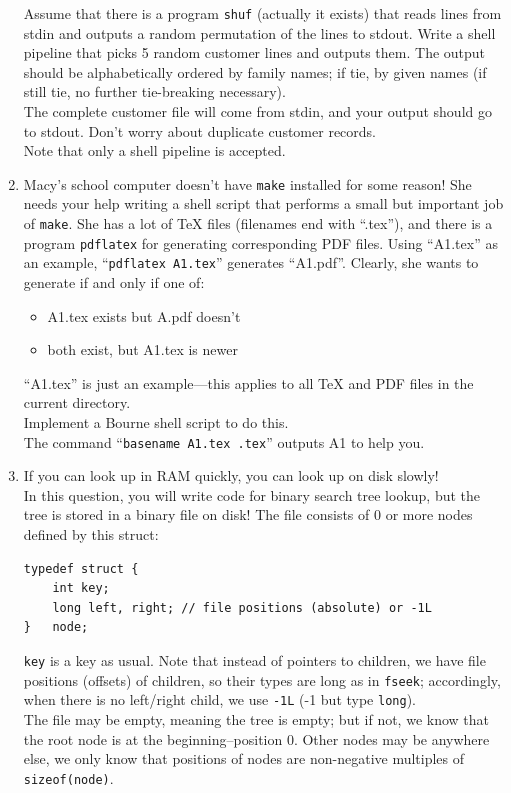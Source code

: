 \documentclass[11pt]{article}
\begin{document}
\begin{enumerate}
		Assume that there is a program \Verb|shuf| (actually it exists) that reads lines from stdin and outputs a random permutation of the lines to stdout. Write a shell pipeline that picks 5 random customer lines and outputs them. The output should be alphabetically ordered by family names; if tie, by given names (if still tie, no further tie-breaking necessary).\\

		The complete customer file will come from stdin, and your output should go to stdout. Don’t worry about duplicate customer records.\\

		Note that only a shell pipeline is accepted.
			

	\item Macy’s school computer doesn’t have \Verb|make| installed for some reason! She needs your help writing a shell script that performs a small but important job of \Verb|make|. She has a lot of TeX files (filenames end with “.tex”), and there is a program \Verb|pdflatex| for generating corresponding PDF files. Using “A1.tex” as an example, “\Verb|pdflatex A1.tex|” generates “A1.pdf”. Clearly, she wants to generate if and only if one of:
		\begin{itemize}
			\item A1.tex exists but A.pdf doesn't
			\item both exist, but A1.tex is newer
		\end{itemize}
		“A1.tex” is just an example—this applies to all TeX and PDF files in the current directory.\\ Implement a Bourne shell script to do this.\\
		The command “\Verb|basename A1.tex .tex|” outputs A1 to help you.
			

	\newpage
	\item If you can look up in RAM quickly, you can look up on disk slowly!\\
		In this question, you will write code for binary search tree lookup, but the tree is stored in a binary file on disk! The file consists of 0 or more nodes defined by this struct:
		\begin{Verbatim}
typedef struct {
	int key;
	long left, right; // file positions (absolute) or -1L
}   node;
		\end{Verbatim}
		\Verb|key| is a key as usual. Note that instead of pointers to children, we have file positions (offsets) of children, so their types are long as in \Verb|fseek|; accordingly, when there is no left/right child, we use \Verb|-1L| (-1 but type \Verb|long|).\\
		The file may be empty, meaning the tree is empty; but if not, we know that the root node is at the beginning--position 0. Other nodes may be anywhere else, we only know that positions of nodes are non-negative multiples of \Verb|sizeof(node)|.\\


\end{enumerate}
\end{document}

